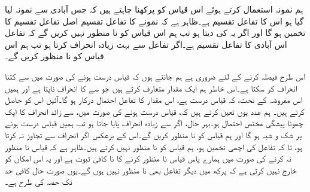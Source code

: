 ہم نمونہ  استعمال کرتے ہوئے اس قیاس کو پرکھنا چاہتے ہیں کہ جس آبادی سے نمونہ لیا گیا ہو اس کا  تفاعل تقسیم  ہے۔ظاہر ہے کہ نمونے کا تفاعل تقسیم  اصل تفاعل تقسیم  کا تخمین ہو گا اور اگر یہ  کی  دیتا ہو تب ہم اس قیاس کو نا منظور  نہیں کریں گے کہ تفاعل  اس آبادی کا تفاعل تقسیم ہے۔اگر  تفاعل  سے بہت زیادہ انحراف کرتا ہو تب ہم اس قیاس کو نا منظور کریں گے۔ 

اس طرح فیصلہ کرنے کے لئے ضروری ہے ہم جانتے ہوں کہ قیاس درست ہونے کی صورت میں  سے    کتنا انحراف کر سکتا ہے۔اس خاطر ہم ایک مقدار متعارف کرتے ہیں جو  سے  کا انحراف ناپتا ہے اور ہمیں اس مفروضہ کے تحت، کہ قیاس درست ہے، اس مقدار کا تفاعل احتمال درکار ہو گا۔آئیں اس کو حاصل کرتے ہیں۔ ہم عدد  یوں تعین کرتے ہیں کہ، قیاس درست ہونے کی صورت میں،  سے زائد انحراف کا ایک  چھوٹا پیشگی مختص احتمال ہو۔بہر حال، اگر  سے زیادہ انحراف پایا جاتا ہو تب ہمیں قیاس درست ہونے پر شک و شبہ ہو گا اور ہم قیاس کو نا منظور کریں گے۔اس کے برعکس اگر انحراف  سے تجاوز نہ کرتا ہو، تا کہ  تفاعل  کی اچھی تخمین ہو، ہم قیاس کو نا منظور نہیں کرتے ہیں۔ظاہر ہے کہ قیاس نا منظور نہ کرنے کی صورت میں ہمارے پاس قیاس نا منظور کرنے کا نا کافی ثبوت ہے اور یہ اس امکان کو خارج نہیں کرتی ہے کہ پرکھ میں دیگر تفاعل بھی نا منظور نہیں ہوں گے۔یوں صورت حال کافی حد تک  حصہ  کی طرح ہے۔ 


